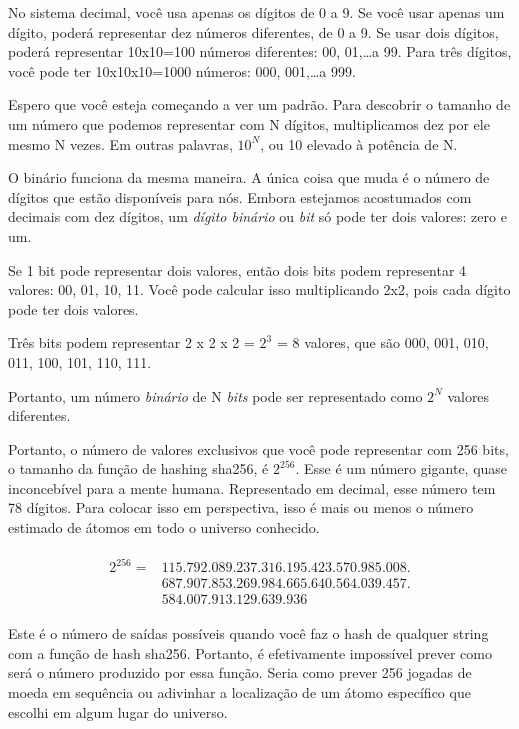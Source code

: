 No sistema decimal, você usa apenas os dígitos de 0 a 9. Se você usar apenas um dígito, poderá representar dez números diferentes, de 0 a 9. Se usar dois dígitos, poderá representar 10x10=100 números diferentes: 00, 01,\ldots a 99. Para três dígitos, você pode ter 10x10x10=1000 números: 000, 001,\ldots a 999.

Espero que você esteja começando a ver um padrão. Para descobrir o tamanho de um número que podemos representar com N dígitos, multiplicamos dez por ele mesmo N vezes. Em outras palavras, \(10^N\), ou 10 elevado à potência de N.

O binário funciona da mesma maneira. A única coisa que muda é o número de dígitos que estão disponíveis para nós. Embora estejamos acostumados com decimais com dez dígitos, um \textit{dígito binário} ou \textit{bit} só pode ter dois valores: zero e um.

Se 1 bit pode representar dois valores, então dois bits podem representar 4 valores: 00, 01, 10, 11. Você pode calcular isso multiplicando 2x2, pois cada dígito pode ter dois valores.

Três bits podem representar 2 x 2 x 2 = \(2^3\) = 8 valores, que são 000, 001, 010, 011, 100, 101, 110, 111.

Portanto, um número \textit{binário} de N \textit{bits} pode ser representado como \(2^N\) valores diferentes.

Portanto, o número de valores exclusivos que você pode representar com 256 bits, o tamanho da função de hashing sha256, é \(2^{256}\). Esse é um número gigante, quase inconcebível para a mente humana. Representado em decimal, esse número tem 78 dígitos. Para colocar isso em perspectiva, isso é mais ou menos o número estimado de átomos em todo o universo conhecido.


\begin{multline}
\begin{aligned}
2^{256} = & 115.792.089.237.316.195.423.570.985.008.\\
& 687.907.853.269.984.665.640.564.039.457.\\
& 584.007.913.129.639.936
\end{aligned}
\end{multline}


Este é o número de saídas possíveis quando você faz o hash de qualquer string com a função de hash sha256. Portanto, é efetivamente impossível prever como será o número produzido por essa função. Seria como prever 256 jogadas de moeda em sequência ou adivinhar a localização de um átomo específico que escolhi em algum lugar do universo.


